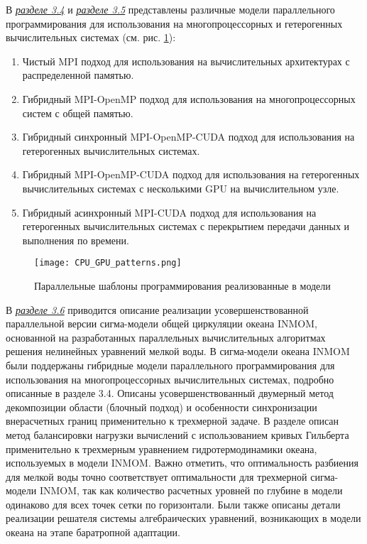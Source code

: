 В \underline{\textit{разделе 3.4}} и \underline{\textit{разделе 3.5}} представлены различные модели параллельного программирования для использования на многопроцессорных и гетерогенных вычислительных системах (см. рис. \ref{fig:patterns}):

\begin{enumerate}

\item Чистый MPI подход для использования на вычислительных архитектурах с распределенной памятью.
\item Гибридный MPI-OpenMP подход для использования на многопроцессорных систем с общей памя­тью.
\item Гибридный синхронный MPI-OpenMP-CUDA подход для использования на гетерогенных вычислительных системах.
\item Гибридный MPI-OpenMP-CUDA подход для использования на гетерогенных вычислительных системах с несколькими GPU на вычислительном узле.
\item Гибридный асинхронный MPI-CUDA подход для использования на гетерогенных вычислительных системах с перекрытием передачи данных и выполнения по времени.

\end{enumerate}

\begin{figure}[!ht]
	\texttt{[image: CPU\_GPU\_patterns.png]}
	\vspace{3pt}
	\caption{Параллельные шаблоны программирования реализованные в модели}
	\label{fig:patterns}
\end{figure}


В \underline{\textit{разделе 3.6}} приводится описание реализации усовершенствованной параллельной версии сигма-модели общей циркуляции океана INMOM, основанной на разработанных параллельных вычислительных алгоритмах решения нелинейных уравнений мелкой воды.
В сигма-модели океана INMOM были поддержаны гибридные модели параллельного программирования для использования на многопроцессорных вычислительных системах, подробно описанные в разделе 3.4.
Описаны усовершенствованный двумерный метод декомпозиции области (блочный подход) и особенности синхронизации внерасчетных границ применительно к трехмерной задаче.
В разделе описан метод баланси­ровки нагрузки вычислений с использованием кривых Гильберта применительно к трехмерным уравнением гидротермодинамики океана, используемых в модели INMOM.
Важно отметить, что оптимальность разбиения для мелкой воды точно соответствует оптимальности для трехмерной сигма-модели INMOM, так как количество расчетных уровней по глубине в модели одинаково для всех точек сетки по горизонтали.
Были также описаны детали реализации решателя системы алгебраических уравнений, возникающих в модели океана на этапе баратропной адаптации.

